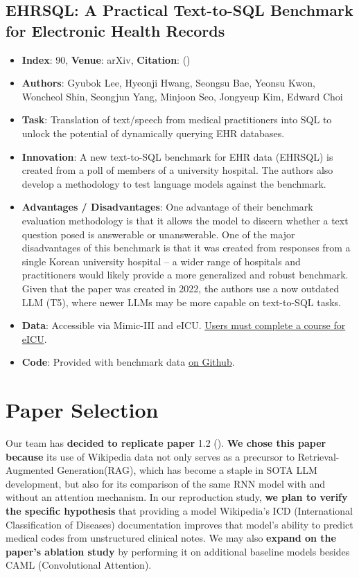 \documentclass[
	letterpaper, %
]{jdf}
\newcommand{\pcite}[1]{(\cite{#1})}
\begin{document}
\subsection{EHRSQL: A Practical Text-to-SQL Benchmark for Electronic Health Records}
\begin{itemize}[noitemsep,topsep=0pt,parsep=0pt,partopsep=0pt]
\item \textbf{Index}: 90, \textbf{Venue}: arXiv, \textbf{Citation}: \pcite{lee2023ehrsqlpracticaltexttosqlbenchmark}
\item \textbf{Authors}: Gyubok Lee, Hyeonji Hwang, Seongsu Bae, Yeonsu Kwon, Woncheol Shin, Seongjun Yang, Minjoon Seo, Jongyeup Kim, Edward Choi
\item \textbf{Task}: Translation of text/speech from medical practitioners into SQL to unlock the potential of dynamically querying EHR databases. 
\item \textbf{Innovation}: A new text-to-SQL benchmark for EHR data (EHRSQL) is created from a poll of members of a university hospital. The authors also develop a methodology to test language models against the benchmark. 
\item \textbf{Advantages / Disadvantages}: One advantage of their benchmark evaluation methodology is that it allows the model to discern whether a text question posed is answerable or unanswerable. One of the major disadvantages of this benchmark is that it was created from responses from a single Korean university hospital -- a wider range of hospitals and practitioners would likely provide a more generalized and robust benchmark. Given that the paper was created in 2022, the authors use a now outdated LLM (T5), where newer LLMs may be more capable on text-to-SQL tasks. 
\item \textbf{Data}: Accessible via Mimic-III and eICU. \href{https://physionet.org/content/eicu-crd/2.0/}{Users must complete a course for eICU}.
\item \textbf{Code}: Provided with benchmark data \href{https://github.com/glee4810/EHRSQL}{on Github}.
\end{itemize}

\section{Paper Selection}
Our team has \textbf{decided to replicate paper} 1.2 \pcite{improving_code_prediction}. \textbf{We chose this paper because} its use of Wikipedia data not only serves as a precursor to Retrieval-Augmented Generation(RAG), which has become a staple in SOTA LLM development, but also for its comparison of the same RNN model with and without an attention mechanism. In our reproduction study, \textbf{we plan to verify the specific hypothesis} that providing a model Wikipedia's ICD (International Classification of Diseases) documentation improves that model's ability to predict medical codes from unstructured clinical notes. We may also \textbf{expand on the paper's ablation study} by performing it on additional baseline models besides CAML (Convolutional Attention).
\end{document}
